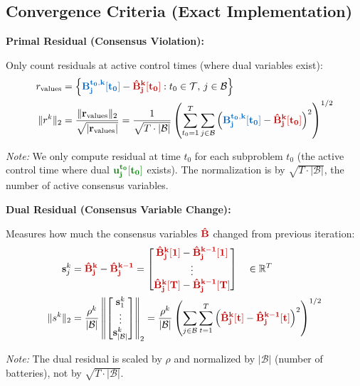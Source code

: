 \documentclass[11pt]{article}
\newcommand{\blueB}[1]{\textcolor{bluevar}{\mathbf{#1}}}      %
\newcommand{\redBhat}[1]{\textcolor{redvar}{\mathbf{#1}}}     %
\newcommand{\greenu}[1]{\textcolor{greenvar}{\mathbf{#1}}}    %
\begin{document}
\subsection{Convergence Criteria (Exact Implementation)}

\textbf{Primal Residual (Consensus Violation):}

Only count residuals at active control times (where dual variables exist):
\begin{align}
r_{\text{values}} &= \left\{ \blueB{B_j^{t_0,k}[t_0]} - \redBhat{\hat{B}_j^k[t_0]} : t_0 \in \mathcal{T}, \, j \in \mathcal{B} \right\} \\
\|r^k\|_2 &= \frac{\|\mathbf{r}_{\text{values}}\|_2}{\sqrt{|\mathbf{r}_{\text{values}}|}} = \frac{1}{\sqrt{T \cdot |\mathcal{B}|}} \left( \sum_{t_0=1}^T \sum_{j \in \mathcal{B}} \left( \blueB{B_j^{t_0,k}[t_0]} - \redBhat{\hat{B}_j^k[t_0]} \right)^2 \right)^{1/2}
\end{align}

\textit{Note:} We only compute residual at time $t_0$ for each subproblem $t_0$ (the active control time where dual $\greenu{u_j^{t_0}[t_0]}$ exists). The normalization is by $\sqrt{T \cdot |\mathcal{B}|}$, the number of active consensus variables.

\textbf{Dual Residual (Consensus Variable Change):}

Measures how much the consensus variables $\redBhat{\hat{B}}$ changed from previous iteration:
\begin{align}
\mathbf{s}_j^k &= \redBhat{\hat{B}_j^k} - \redBhat{\hat{B}_j^{k-1}} = \begin{bmatrix} \redBhat{\hat{B}_j^k[1]} - \redBhat{\hat{B}_j^{k-1}[1]} \\ \vdots \\ \redBhat{\hat{B}_j^k[T]} - \redBhat{\hat{B}_j^{k-1}[T]} \end{bmatrix} \quad \in \mathbb{R}^T \\
\|s^k\|_2 &= \frac{\rho^k}{|\mathcal{B}|} \left\| \begin{bmatrix} \mathbf{s}_1^k \\ \vdots \\ \mathbf{s}_{|\mathcal{B}|}^k \end{bmatrix} \right\|_2 = \frac{\rho^k}{|\mathcal{B}|} \left( \sum_{j \in \mathcal{B}} \sum_{t=1}^T \left( \redBhat{\hat{B}_j^k[t]} - \redBhat{\hat{B}_j^{k-1}[t]} \right)^2 \right)^{1/2}
\end{align}

\textit{Note:} The dual residual is scaled by $\rho$ and normalized by $|\mathcal{B}|$ (number of batteries), not by $\sqrt{T \cdot |\mathcal{B}|}$.
\end{document}
